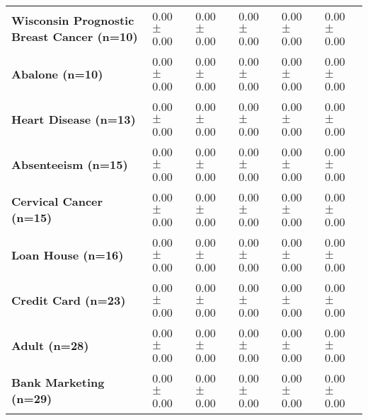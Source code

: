 \begin{table}[htb]
{\begin{tabular}{llllll}
\textbf{Wisconsin Prognostic Breast Cancer (n=10)} &  \phantom{0}0.00 $\pm$ \phantom{0}0.00 &             \phantom{0}0.00 $\pm$ \phantom{0}0.00 &  \phantom{0}0.00 $\pm$ \phantom{0}0.00 &  \phantom{0}0.00 $\pm$ \phantom{0}0.00 &  \phantom{0}0.00 $\pm$ \phantom{0}0.00 \\
\textbf{Abalone (n=10)                           } &  \phantom{0}0.00 $\pm$ \phantom{0}0.00 &             \phantom{0}0.00 $\pm$ \phantom{0}0.00 &  \phantom{0}0.00 $\pm$ \phantom{0}0.00 &  \phantom{0}0.00 $\pm$ \phantom{0}0.00 &  \phantom{0}0.00 $\pm$ \phantom{0}0.00 \\
\textbf{Heart Disease (n=13)                     } &  \phantom{0}0.00 $\pm$ \phantom{0}0.00 &             \phantom{0}0.00 $\pm$ \phantom{0}0.00 &  \phantom{0}0.00 $\pm$ \phantom{0}0.00 &  \phantom{0}0.00 $\pm$ \phantom{0}0.00 &  \phantom{0}0.00 $\pm$ \phantom{0}0.00 \\
\textbf{Absenteeism (n=15)                       } &  \phantom{0}0.00 $\pm$ \phantom{0}0.00 &             \phantom{0}0.00 $\pm$ \phantom{0}0.00 &  \phantom{0}0.00 $\pm$ \phantom{0}0.00 &  \phantom{0}0.00 $\pm$ \phantom{0}0.00 &  \phantom{0}0.00 $\pm$ \phantom{0}0.00 \\
\textbf{Cervical Cancer (n=15)                   } &  \phantom{0}0.00 $\pm$ \phantom{0}0.00 &             \phantom{0}0.00 $\pm$ \phantom{0}0.00 &  \phantom{0}0.00 $\pm$ \phantom{0}0.00 &  \phantom{0}0.00 $\pm$ \phantom{0}0.00 &  \phantom{0}0.00 $\pm$ \phantom{0}0.00 \\
\textbf{Loan House (n=16)                        } &  \phantom{0}0.00 $\pm$ \phantom{0}0.00 &             \phantom{0}0.00 $\pm$ \phantom{0}0.00 &  \phantom{0}0.00 $\pm$ \phantom{0}0.00 &  \phantom{0}0.00 $\pm$ \phantom{0}0.00 &  \phantom{0}0.00 $\pm$ \phantom{0}0.00 \\
\textbf{Credit Card (n=23)                       } &  \phantom{0}0.00 $\pm$ \phantom{0}0.00 &             \phantom{0}0.00 $\pm$ \phantom{0}0.00 &  \phantom{0}0.00 $\pm$ \phantom{0}0.00 &  \phantom{0}0.00 $\pm$ \phantom{0}0.00 &  \phantom{0}0.00 $\pm$ \phantom{0}0.00 \\
\textbf{Adult (n=28)                             } &  \phantom{0}0.00 $\pm$ \phantom{0}0.00 &             \phantom{0}0.00 $\pm$ \phantom{0}0.00 &  \phantom{0}0.00 $\pm$ \phantom{0}0.00 &  \phantom{0}0.00 $\pm$ \phantom{0}0.00 &  \phantom{0}0.00 $\pm$ \phantom{0}0.00 \\
\textbf{Bank Marketing (n=29)                    } &  \phantom{0}0.00 $\pm$ \phantom{0}0.00 &             \phantom{0}0.00 $\pm$ \phantom{0}0.00 &  \phantom{0}0.00 $\pm$ \phantom{0}0.00 &  \phantom{0}0.00 $\pm$ \phantom{0}0.00 &  \phantom{0}0.00 $\pm$ \phantom{0}0.00 \\

\end{tabular}}
\end{table}
